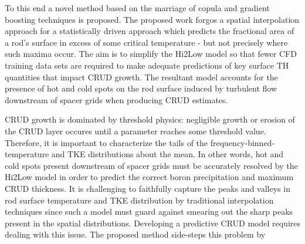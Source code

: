 To this end a novel method based on the marriage of copula and gradient boosting techniques
is proposed.  The proposed work forgos a spatial interpolation
approach for a statistically driven approach which predicts the fractional
area of a rod's surface in excess of some critical temperature - but not
precisely where such maxima occur.  The aim is to simplify the Hi2Low model 
so that fewer CFD training data sets are required
to make adequate predictions of key surface TH quantities that impact CRUD growth.  
The resultant model accounts for the presence of
hot and cold spots on the rod surface induced by turbulent flow downstream of spacer grids
when producing CRUD estimates.

CRUD growth is dominated by threshold physics: negligible growth or
erosion of the CRUD layer occures until a parameter reaches some threshold value.  Therefore, it is
important to characterize the tails of the frequency-binned-temperature and
TKE distributions about the mean.  In other words, hot and cold spots
present downstream of spacer grids must be accurately resolved by the Hi2Low model
in order to predict the correct boron precipitation and maximum CRUD
thickness.  It is challenging to faithfully capture the peaks and valleys in
rod surface temperature and TKE distribution by traditional interpolation
techniques since such a model must guard against smearing out the sharp peaks
present in the spatial distributions.  Developing a predictive CRUD model requires
dealing with this issue. The proposed method side-steps this problem by
